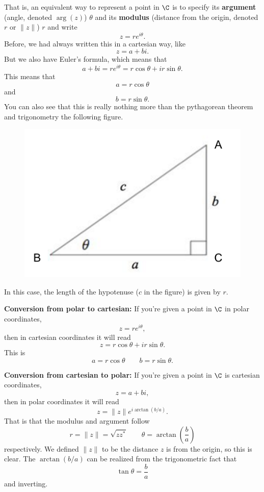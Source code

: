         That is, an equivalent way to represent a point in $\C$ is to specify its \textbf{argument} (angle, denoted $\arg(z)$) $\theta$ and its \textbf{modulus} (distance from the origin, denoted $r$ or $\|z\|$) $r$ and write
        \[
        z=re^{i\theta}.
        \]
        Before, we had always written this in a cartesian way, like
        \[
        z=a+bi.
        \]
        But we also have Euler's formula, which means that
        \[
        a+bi = re^{i\theta} = r\cos \theta + i r \sin \theta.
        \]
        This means that
        \[
        a=r\cos \theta
        \]
        and 
        \[
        b = r \sin \theta.
        \]
        You can also see that this is really nothing more than the pythagorean theorem and trigonometry the following figure.
        \begin{figure}[H]
            \centering
            \includegraphics[width=.4\textwidth]{Figures/triangle_theta.png}
        \end{figure}
        In this case, the length of the hypotenuse ($c$ in the figure) is given by $r$. 
        
        \noindent \textbf{\textbf{Conversion from polar to cartesian:}} If you're given a point in $\C$ in polar coordinates,
        \[
        z=re^{i\theta},
        \]
        then in cartesian coordinates it will read
        \[
        z=r\cos \theta + ir\sin \theta.
        \]
        This is
        \[
        a=r\cos \theta \qquad b=r\sin \theta.
        \]
        
        \noindent \textbf{\textbf{Conversion from cartesian to polar:}} If you're given a point in $\C$ is cartesian coordinates,
        \[
        z=a+bi,
        \]
        then in polar coordinates it will read
        \[
        z=\|z\|e^{i\arctan(b/a)}.
        \]
        That is that the modulus and argument follow
        \[
        r = \|z\|=\sqrt{zz^*} \qquad \theta = \arctan\left( \frac{b}{a}\right)
        \]
        respectively. We defined $\|z\|$ to be the distance $z$ is from the origin, so this is clear.  The $\arctan(b/a)$ can be realized from the trigonometric fact that
        \[
        \tan \theta = \frac{b}{a}
        \]
        and inverting.
        
